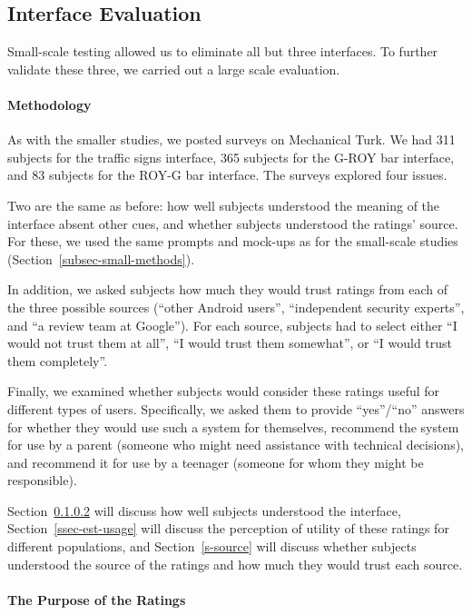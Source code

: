 \documentclass[11pt]{article}
\newcommand{\refsec}[1]{Section~\ref{#1}}
\begin{document}
\subsection{Interface Evaluation}
\label{s-sec-largescale}

Small-scale testing allowed us to eliminate all but three interfaces. 
To further validate these three, we carried out a large scale evaluation.

\paragraph{Methodology}
\label{subsec-large-methods}

As with the smaller studies, we posted surveys on Mechanical
Turk. We had 311 subjects for the traffic signs interface, 365
subjects for the G-ROY bar interface, and 83 subjects for the ROY-G bar
interface. The surveys explored four issues. 

Two are the same
as before: how well subjects understood the meaning of the interface
absent other cues, and whether subjects understood the ratings' source.
For these, we used the same prompts and mock-ups as for the
small-scale studies (\refsec{subsec-small-methods}).

In addition, we asked 
subjects how much they would trust ratings from each
of the three possible sources (``other Android users'', 
``independent security experts'', and ``a review team at Google''). 
For each source, subjects
had to select either ``I would not trust them at all'',
``I would trust them somewhat'', or ``I would trust 
them completely''.

Finally, we examined whether subjects would consider
these ratings useful for different types of users.
Specifically, we asked them to
provide ``yes''/``no'' answers for whether they would 
use such a system for themselves, recommend the system for use by a
parent (someone who might need assistance with technical decisions), and 
recommend it for use
by a teenager (someone for whom they might be
responsible).

\refsec{subsec-subject-understanding} will discuss how well
subjects understood the interface, \refsec{ssec-est-usage} will 
discuss the perception of utility of these ratings for different
populations, and \refsec{s-source} will discuss whether subjects 
understood the source of the ratings and how much they would trust each source.

\paragraph{The Purpose of the Ratings}
\label{subsec-subject-understanding}
\end{document}
